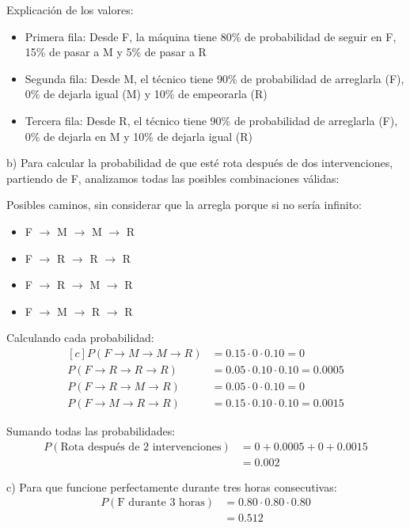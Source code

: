 \documentclass[a4paper,11pt]{article}
\begin{document}
Explicación de los valores:
\begin{itemize}
    \item Primera fila: Desde F, la máquina tiene 80\% de probabilidad de seguir en F, 15\% de pasar a M y 5\% de pasar a R
    \item Segunda fila: Desde M, el técnico tiene 90\% de probabilidad de arreglarla (F), 0\% de dejarla igual (M) y 10\% de empeorarla (R)
    \item Tercera fila: Desde R, el técnico tiene 90\% de probabilidad de arreglarla (F), 0\% de dejarla en M y 10\% de dejarla igual (R)
\end{itemize}

b) Para calcular la probabilidad de que esté rota después de dos intervenciones, partiendo de F, analizamos todas las posibles combinaciones válidas:

\vspace{0.5em}
Posibles caminos, sin considerar que la arregla porque si no sería infinito:
\begin{itemize}
    \item F $\rightarrow$ M $\rightarrow$ M $\rightarrow$ R
    \item F $\rightarrow$ R $\rightarrow$ R $\rightarrow$ R  
    \item F $\rightarrow$ R $\rightarrow$ M $\rightarrow$ R
    \item F $\rightarrow$ M $\rightarrow$ R $\rightarrow$ R
\end{itemize}

Calculando cada probabilidad:
\[
\begin{aligned}[c]
P(F \rightarrow M \rightarrow M \rightarrow R) &= 0.15 \cdot 0 \cdot 0.10 = 0 \\
P(F \rightarrow R \rightarrow R \rightarrow R) &= 0.05 \cdot 0.10 \cdot 0.10 = 0.0005 \\
P(F \rightarrow R \rightarrow M \rightarrow R) &= 0.05 \cdot 0 \cdot 0.10 = 0 \\
P(F \rightarrow M \rightarrow R \rightarrow R) &= 0.15 \cdot 0.10 \cdot 0.10 = 0.0015
\end{aligned}
\]

Sumando todas las probabilidades:
\[
\begin{split}
P(\text{Rota después de 2 intervenciones}) &= 0 + 0.0005 + 0 + 0.0015 \\
&= 0.002
\end{split}
\]

\vspace{0.5em}

c) Para que funcione perfectamente durante tres horas consecutivas:
\[
\begin{split}
P(\text{F durante 3 horas}) &= 0.80 \cdot 0.80 \cdot 0.80 \\
&= 0.512
\end{split}
\]
\end{document}
